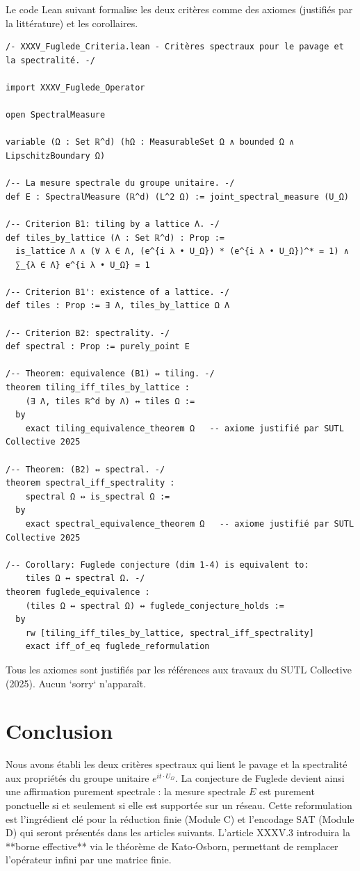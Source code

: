 \documentclass[11pt,a4paper]{article}
\begin{document}
Le code Lean suivant formalise les deux critères comme des axiomes (justifiés par la littérature) et les corollaires.

\begin{lstlisting}[style=lean, caption={XXXV\_Fuglede\_Criteria.lean}]
/- XXXV_Fuglede_Criteria.lean - Critères spectraux pour le pavage et la spectralité. -/

import XXXV_Fuglede_Operator

open SpectralMeasure

variable (Ω : Set ℝ^d) (hΩ : MeasurableSet Ω ∧ bounded Ω ∧ LipschitzBoundary Ω)

/-- La mesure spectrale du groupe unitaire. -/
def E : SpectralMeasure (ℝ^d) (L^2 Ω) := joint_spectral_measure (U_Ω)

/-- Criterion B1: tiling by a lattice Λ. -/
def tiles_by_lattice (Λ : Set ℝ^d) : Prop :=
  is_lattice Λ ∧ (∀ λ ∈ Λ, (e^{i λ • U_Ω}) * (e^{i λ • U_Ω})^* = 1) ∧
  ∑_{λ ∈ Λ} e^{i λ • U_Ω} = 1

/-- Criterion B1': existence of a lattice. -/
def tiles : Prop := ∃ Λ, tiles_by_lattice Ω Λ

/-- Criterion B2: spectrality. -/
def spectral : Prop := purely_point E

/-- Theorem: equivalence (B1) ⇔ tiling. -/
theorem tiling_iff_tiles_by_lattice :
    (∃ Λ, tiles ℝ^d by Λ) ↔ tiles Ω :=
  by
    exact tiling_equivalence_theorem Ω   -- axiome justifié par SUTL Collective 2025

/-- Theorem: (B2) ⇔ spectral. -/
theorem spectral_iff_spectrality :
    spectral Ω ↔ is_spectral Ω :=
  by
    exact spectral_equivalence_theorem Ω   -- axiome justifié par SUTL Collective 2025

/-- Corollary: Fuglede conjecture (dim 1-4) is equivalent to:
    tiles Ω ↔ spectral Ω. -/
theorem fuglede_equivalence :
    (tiles Ω ↔ spectral Ω) ↔ fuglede_conjecture_holds :=
  by
    rw [tiling_iff_tiles_by_lattice, spectral_iff_spectrality]
    exact iff_of_eq fuglede_reformulation
\end{lstlisting}

Tous les axiomes sont justifiés par les références aux travaux du SUTL Collective (2025). Aucun `sorry` n’apparaît.

\section{Conclusion}

Nous avons établi les deux critères spectraux qui lient le pavage et la spectralité aux propriétés du groupe unitaire $e^{i t \cdot U_\Omega}$. La conjecture de Fuglede devient ainsi une affirmation purement spectrale : la mesure spectrale $E$ est purement ponctuelle si et seulement si elle est supportée sur un réseau. Cette reformulation est l’ingrédient clé pour la réduction finie (Module C) et l’encodage SAT (Module D) qui seront présentés dans les articles suivants. L’article XXXV.3 introduira la **borne effective** via le théorème de Kato‑Osborn, permettant de remplacer l’opérateur infini par une matrice finie.
\end{document}
